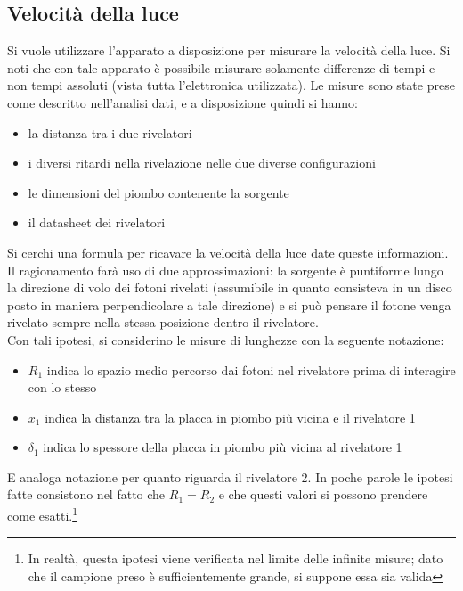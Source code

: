 \subsection{Velocità della luce}

Si vuole utilizzare l'apparato a disposizione per misurare la velocità della luce. Si noti che con tale apparato è possibile misurare solamente differenze di tempi
e non tempi assoluti (vista tutta l'elettronica utilizzata). Le misure sono state prese come descritto nell'analisi dati, e a disposizione quindi si hanno:
\begin{itemize}
\item la distanza tra i due rivelatori
\item i diversi ritardi nella rivelazione nelle due diverse configurazioni
\item le dimensioni del piombo contenente la sorgente
\item il datasheet dei rivelatori
\end{itemize}
Si cerchi una formula per ricavare la velocità della luce date queste informazioni. Il ragionamento farà uso di due approssimazioni: la sorgente è puntiforme lungo la direzione
di volo dei fotoni rivelati (assumibile in quanto consisteva in un disco posto in maniera perpendicolare a tale direzione)
e si può pensare il fotone venga rivelato sempre nella stessa posizione dentro il rivelatore.\\

Con tali ipotesi, si considerino le misure di lunghezze con la seguente notazione:
\begin{itemize}
\item $R_1$ indica lo spazio medio percorso dai fotoni nel rivelatore prima di interagire con lo stesso
\item $x_1$ indica la distanza tra la placca in piombo più vicina e il rivelatore 1
\item $\delta_1$ indica lo spessore della placca in piombo più vicina al rivelatore 1
\end{itemize}
E analoga notazione per quanto riguarda il rivelatore 2. In poche parole le ipotesi fatte consistono nel fatto che $R_1=R_2$ e che questi valori si possono prendere
come esatti.\footnote{In realtà, questa ipotesi viene verificata nel limite delle infinite misure; dato che il campione preso è sufficientemente grande, si suppone essa sia
valida}\\


